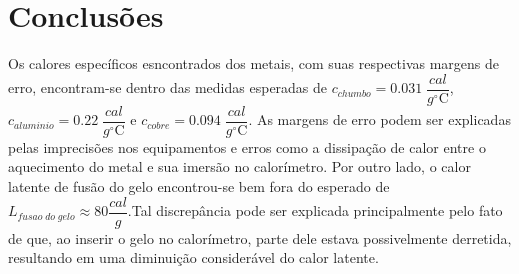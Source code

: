 \documentclass[12pt,a4paper]{article}
\begin{document}
\section{Conclusões}
Os calores específicos esncontrados dos metais, com suas respectivas margens de erro, encontram-se dentro das medidas esperadas de $ c_{chumbo} = 0.031 \; \dfrac{cal}{g^{\circ}\mathrm{C}}$, $ c_{aluminio} = 0.22  \; \dfrac{cal}{g^{\circ}\mathrm{C}}$ e $ c_{cobre} = 0.094\; \dfrac{cal}{g^{\circ}\mathrm{C}}$. As margens de erro podem ser explicadas pelas imprecisões nos equipamentos e erros como a dissipação de calor entre o aquecimento do metal e sua imersão no calorímetro.
Por outro lado, o calor latente de fusão do gelo encontrou-se bem fora do esperado de $ L_{fusao\;do\;gelo} \approx 80 \dfrac{cal}{g}$.Tal discrepância pode ser explicada principalmente pelo fato de que, ao inserir o gelo no calorímetro, parte dele estava possivelmente derretida, resultando em uma diminuição considerável do calor latente.
\end{document}
